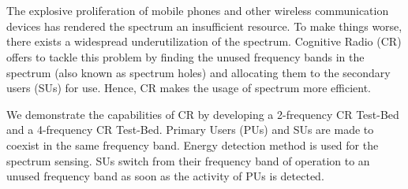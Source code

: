 \chapter*{}
The explosive proliferation of mobile phones and other wireless communication
devices has rendered the spectrum an insufficient resource. To make things
worse, there exists a widespread underutilization of the spectrum. Cognitive
Radio (CR) offers to tackle this problem by finding the unused frequency bands
in the spectrum (also known as spectrum holes) and allocating them to the
secondary users (SUs) for use. Hence, CR makes the usage of spectrum more
efficient.

We demonstrate the capabilities of CR by developing a 2-frequency CR Test-Bed
and a 4-frequency CR Test-Bed. Primary Users (PUs) and SUs are made to
coexist in the same frequency band. Energy detection method is used for the
spectrum sensing. SUs switch from their frequency band of operation to an
unused frequency band as soon as the activity of PUs is detected.